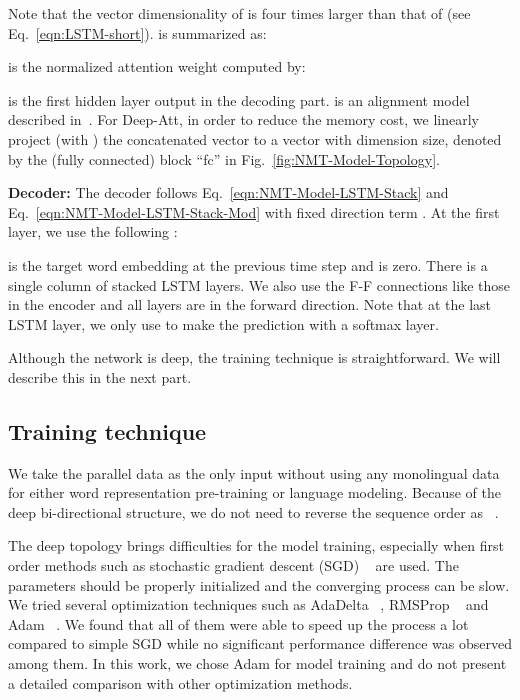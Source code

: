\documentclass[11pt,letterpaper]{article}
\begin{document}
Note that the vector dimensionality of  is four times larger than that of  (see Eq.~\ref{eqn:LSTM-short}).  is summarized
as:

 is the normalized attention weight computed by:

 is the first hidden layer output in the decoding part.  is an alignment model described
in~\cite{Bahdanau-Bengio-ICLR2015}.  For Deep-Att, in order to reduce the memory cost, we linearly project (with ) the
concatenated vector   to a vector with  dimension size, denoted by the (fully connected) block ``fc'' in
Fig.~\ref{fig:NMT-Model-Topology}.

\noindent\textbf{Decoder:}  The decoder follows Eq.~\ref{eqn:NMT-Model-LSTM-Stack} and Eq.~\ref{eqn:NMT-Model-LSTM-Stack-Mod}
with fixed direction term . At the first layer, we use the following :

 is the target word embedding at the previous time step and   is zero. There is a single column of  stacked LSTM layers. We
also use the F-F connections like those in the encoder and all layers are in the forward direction.   Note that at the last LSTM
layer, we only use  to make the prediction with a softmax layer.



Although the network is deep, the training technique is straightforward. We will describe this in the next part. 

\subsection{Training technique}

We  take the parallel data as the only input without using any monolingual data for either word representation pre-training or  language
modeling. Because of the deep bi-directional structure, we do not need to reverse the sequence order as ~.

The deep topology brings difficulties for the model training, especially when  first order methods such as stochastic gradient descent (SGD)
~\cite{Lecun-Haffner-IEEE1998} are used. The parameters should be properly initialized and the converging process can be slow. We tried
several  optimization techniques such as AdaDelta ~\cite{Zeiler-ARXIV2012}, RMSProp ~\cite{Tieleman-Hinton-Lecture2012}  and Adam
~\cite{Kingma-Ba-ICLR2015}. We found that all of them were able to speed up the process a lot compared to simple SGD while no significant
performance difference  was observed \mbox{among} them. In this work, we chose Adam for model training and do not present a detailed
comparison with other optimization methods.
\end{document}
